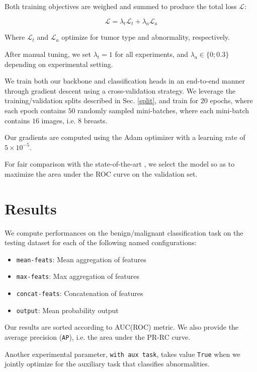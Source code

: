 \documentclass[11pt]{article}
\begin{document}
Both training objectives are weighed and summed to produce
the total loss \(\mathcal{L}\):

\begin{equation}
\mathcal{L} = \lambda_{t}\mathcal{L}_{t} + \lambda_{a}\mathcal{L}_{a}
\end{equation}

Where \(\mathcal{L}_t\) and \(\mathcal{L}_a\) optimize for tumor type
and abnormality, respectively.

After manual tuning, we set \(\lambda_t=1\) for all experiments,
and \(\lambda_a \in \{0; 0.3\}\) depending on experimental setting.

We train both our backbone and classification heads in an end-to-end manner through
gradient descent using a cross-validation strategy.
We leverage the training/validation splits described in Sec. \ref{split}, and train for
\(20\) epochs, where each epoch contains \(50\) randomly sampled mini-batches,
where each mini-batch contains \(16\) images, i.e. \(8\) breasts.

Our gradients are computed using the Adam optimizer with a learning rate of
\(5 \times 10^{-5}\).

For fair comparison with the state-of-the-art \autocite{walsh22}, we select the model so
as to maximize the area under the ROC curve on the validation set.

\section{Results}
\label{sec:org6437d66}

We compute performances on the benign/malignant classification task
on the testing dataset for each of the following named configurations:

\begin{itemize}
\item \texttt{mean-feats}: Mean aggregation of features
\item \texttt{max-feats}: Max aggregation of features
\item \texttt{concat-feats}: Concatenation of features
\item \texttt{output}: Mean probability output
\end{itemize}

Our results are sorted according to AUC(ROC) metric.
We also provide the average precision (\texttt{AP}), i.e. the area under the PR-RC curve.

Another experimental parameter, \texttt{with aux task}, takes value \texttt{True} when we jointly optimize for the
auxiliary task that classifies abnormalities.
\end{document}
